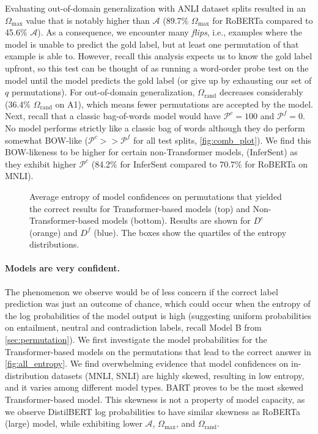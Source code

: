 \documentclass[11pt,a4paper]{article}
\begin{document}
Evaluating out-of-domain generalization with ANLI dataset splits resulted in an $\Omega_{\text{max}}$ value that is notably higher than $\mathcal{A}$ (89.7\% $\Omega_{\text{max}}$ for RoBERTa compared to 45.6\% $\mathcal{A}$). As a consequence, we encounter many \textit{flips}, i.e., examples where the model is unable to predict the gold label, but at least one permutation of that example is able to. However, recall this analysis expects us to know the gold label upfront, so this test can be thought of as running a word-order probe test on the model until the model predicts the gold label (or give up by exhausting our set of $q$ permutations). For out-of-domain generalization, $\Omega_{\text{rand}}$ decreases considerably (36.4\% $\Omega_{\text{rand}}$ on A1), which means fewer permutations are accepted by the model. Next, recall that a classic bag-of-words model would have $\mathcal{P}^c=100$ and $\mathcal{P}^f=0$. No model performs strictly like a classic bag of words although they do perform somewhat BOW-like ($\mathcal{P}^c >> \mathcal{P}^f$ for all test splits, \autoref{fig:comb_plot}). %
We find this BOW-likeness to be higher for certain non-Transformer models, (InferSent) as they exhibit higher $\mathcal{P}^c$ (84.2\% for InferSent compared to 70.7\% for RoBERTa on MNLI).

\begin{figure}[t]
    \centering
    \caption{Average entropy of model confidences on permutations that yielded the correct results for Transformer-based models (top) and Non-Transformer-based models (bottom). Results are shown for $D^c$ (orange) and $D^f$ (blue). The boxes show the quartiles of the entropy distributions.}
    \label{fig:all_entropy}
\end{figure}

\paragraph{Models are very confident.}

The phenomenon we observe would be of less concern if the correct label prediction was just an outcome of chance, which could occur when the entropy of the log probabilities of the model output is high (suggesting uniform probabilities on entailment, neutral and contradiction labels, recall Model B from \autoref{sec:permutation}). We first investigate the model probabilities for the Transformer-based models on the permutations that lead to the correct answer in \autoref{fig:all_entropy}. We find overwhelming evidence that model confidences on in-distribution datasets (MNLI, SNLI) are highly skewed, resulting in low entropy, and it varies among different model types. BART proves to be the most skewed Transformer-based model. This skewness is not a property of model capacity, as we observe DistilBERT log probabilities to have similar skewness as RoBERTa (large) model, while exhibiting lower $\mathcal{A}$, $\Omega_{\text{max}}$, and $\Omega_{\text{rand}}$. 
\end{document}
